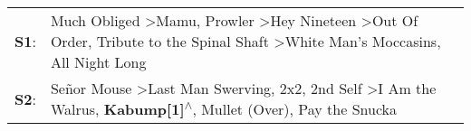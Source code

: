 \begin{supertabular}{p{0.03\textwidth}p{0.92\textwidth}}
 \textbf{S1}:  &  Much Obliged\textsuperscript{} \textgreater \enspace Mamu\textsuperscript{}, \enspace Prowler\textsuperscript{} \textgreater \enspace Hey Nineteen\textsuperscript{} \textgreater \enspace Out Of Order\textsuperscript{}, \enspace Tribute to the Spinal Shaft\textsuperscript{} \textgreater \enspace White Man's Moccasins\textsuperscript{}, \enspace All Night Long\textsuperscript{}  \enspace  \\
 \textbf{S2}:  &                            Señor Mouse\textsuperscript{} \textgreater \enspace Last Man Swerving\textsuperscript{}, \enspace 2x2\textsuperscript{}, \enspace 2nd Self\textsuperscript{} \textgreater \enspace I Am the Walrus\textsuperscript{}, \enspace \textbf{Kabump[1]\textsuperscript{$\wedge$}}, \enspace Mullet (Over)\textsuperscript{}, \enspace Pay the Snucka\textsuperscript{}  \enspace  \\
\end{supertabular}
